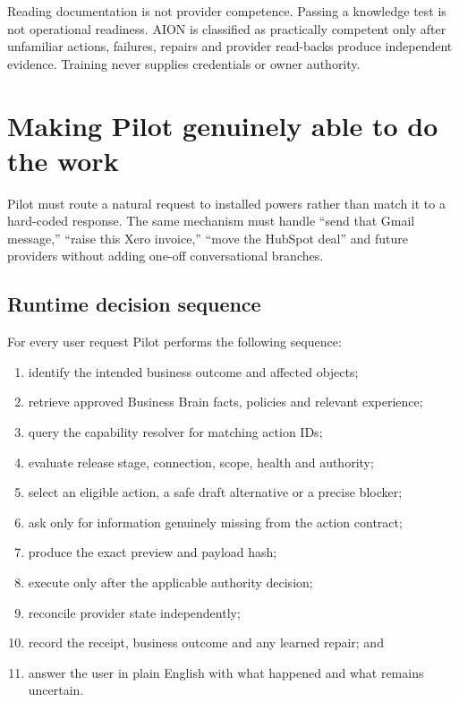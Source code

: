 \documentclass[11pt,a4paper]{article}
\begin{document}
\begin{warningbox}
Reading documentation is not provider competence. Passing a knowledge test is
not operational readiness. AION is classified as practically competent only
after unfamiliar actions, failures, repairs and provider read-backs produce
independent evidence. Training never supplies credentials or owner authority.
\end{warningbox}

\section{Making Pilot genuinely able to do the work}

Pilot must route a natural request to installed powers rather than match it to
a hard-coded response. The same mechanism must handle ``send that Gmail
message,'' ``raise this Xero invoice,'' ``move the HubSpot deal'' and future
providers without adding one-off conversational branches.

\subsection{Runtime decision sequence}

For every user request Pilot performs the following sequence:

\begin{enumerate}
  \item identify the intended business outcome and affected objects;
  \item retrieve approved Business Brain facts, policies and relevant experience;
  \item query the capability resolver for matching action IDs;
  \item evaluate release stage, connection, scope, health and authority;
  \item select an eligible action, a safe draft alternative or a precise blocker;
  \item ask only for information genuinely missing from the action contract;
  \item produce the exact preview and payload hash;
  \item execute only after the applicable authority decision;
  \item reconcile provider state independently;
  \item record the receipt, business outcome and any learned repair; and
  \item answer the user in plain English with what happened and what remains uncertain.
\end{enumerate}
\end{document}
